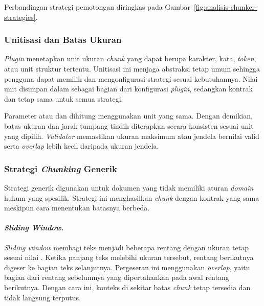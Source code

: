 \noindent Perbandingan strategi pemotongan diringkas pada Gambar~\ref{fig:analisis-chunker-strategies}.

\subsubsection{Unitisasi dan Batas Ukuran}
\label{subsubsec:unitisasi-chunker}

\emph{Plugin} menetapkan unit ukuran \emph{chunk} yang dapat berupa karakter, kata, \emph{token}, atau unit struktur tertentu. Unitisasi ini menjaga abstraksi tetap umum sehingga pengguna dapat memilih dan mengonfigurasi strategi sesuai kebutuhannya. Nilai unit disimpan dalam  sebagai bagian dari konfigurasi \emph{plugin}, sedangkan kontrak  dan  tetap sama untuk semua strategi.

Parameter  atau \mbox{} dan  dihitung menggunakan unit yang sama. Dengan demikian, batas ukuran dan jarak tumpang tindih diterapkan secara konsisten sesuai unit yang dipilih. \emph{Validator} memastikan ukuran maksimum atau jendela bernilai valid serta \emph{overlap} lebih kecil daripada ukuran jendela.

\subsubsection{Strategi \emph{Chunking} Generik}
\label{subsubsec:strategi-chunking-generik}

Strategi generik digunakan untuk dokumen yang tidak memiliki aturan \emph{domain} hukum yang spesifik. Strategi ini menghasilkan \emph{chunk} dengan kontrak yang sama meskipun cara menentukan batasnya berbeda.

\paragraph{\emph{Sliding Window}.}
\label{par:sliding-window}

\emph{Sliding window} membagi teks menjadi beberapa rentang dengan ukuran tetap sesuai nilai \mbox{}. Ketika panjang teks melebihi ukuran tersebut, rentang berikutnya digeser ke bagian teks selanjutnya. Pergeseran ini menggunakan \emph{overlap}, yaitu bagian dari rentang sebelumnya yang dipertahankan pada awal rentang berikutnya. Dengan cara ini, konteks di sekitar batas \emph{chunk} tetap tersedia dan tidak langsung terputus.


